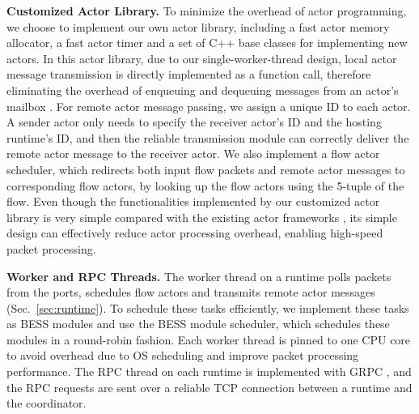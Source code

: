 \vspace{1mm}
\noindent \textbf{Customized Actor Library.} To minimize the overhead of actor programming, we choose to implement our own actor library, including a fast actor memory allocator, a fast actor timer and a set of C++ base classes for implementing new actors. %
In this actor library, due to our single-worker-thread design, local actor message transmission is directly implemented as a function call, therefore eliminating the overhead of enqueuing and dequeuing messages from an actor's mailbox \cite{actor-wiki}. For remote actor message passing, we assign a unique ID to each actor. A sender actor only needs to specify the receiver actor's ID and the hosting runtime's ID, and then the reliable transmission module can correctly deliver the remote actor message to the receiver actor. We also implement a flow actor scheduler, %
 which redirects both input flow packets and remote actor messages to corresponding flow actors, by looking up the flow actors using the 5-tuple of the flow.
 Even though the functionalities implemented by our customized actor library is very simple compared with the existing actor frameworks \cite{akka} \cite{caf}, its simple design can effectively reduce actor processing overhead, enabling high-speed packet processing. %


\vspace{1mm}
\noindent \textbf{Worker and RPC Threads.}
The worker thread on a runtime polls packets from the ports, schedules flow actors and transmits remote actor messages (Sec.~\ref{sec:runtime}). To schedule these tasks efficiently, we implement these tasks as BESS modules and use the BESS module scheduler, which schedules these modules in a round-robin fashion. Each worker thread is pinned to one CPU core to avoid overhead due to OS scheduling and improve packet processing performance. The RPC thread on each runtime is implemented with GRPC \cite{grpc}, and the RPC requests are sent over a reliable TCP connection between a runtime and the coordinator.

